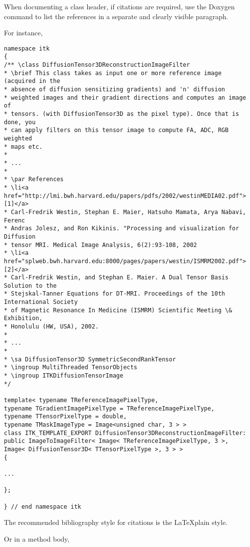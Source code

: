 When documenting a class header, if citations are required, use the Doxygen
 command to list the references in a separate and clearly
visible paragraph.

For instance,

\small
\begin{verbatim}
namespace itk
{
/** \class DiffusionTensor3DReconstructionImageFilter
* \brief This class takes as input one or more reference image (acquired in the
* absence of diffusion sensitizing gradients) and 'n' diffusion
* weighted images and their gradient directions and computes an image of
* tensors. (with DiffusionTensor3D as the pixel type). Once that is done, you
* can apply filters on this tensor image to compute FA, ADC, RGB weighted
* maps etc.
*
* ...
*
* \par References
* \li<a href="http://lmi.bwh.harvard.edu/papers/pdfs/2002/westinMEDIA02.pdf">[1]</a>
* Carl-Fredrik Westin, Stephan E. Maier, Hatsuho Mamata, Arya Nabavi, Ferenc
* Andras Jolesz, and Ron Kikinis. "Processing and visualization for Diffusion
* tensor MRI. Medical Image Analysis, 6(2):93-108, 2002
* \li<a href="splweb.bwh.harvard.edu:8000/pages/papers/westin/ISMRM2002.pdf">[2]</a>
* Carl-Fredrik Westin, and Stephan E. Maier. A Dual Tensor Basis Solution to the
* Stejskal-Tanner Equations for DT-MRI. Proceedings of the 10th International Society
* of Magnetic Resonance In Medicine (ISMRM) Scientific Meeting \& Exhibition,
* Honolulu (HW, USA), 2002.
*
* ...
*
* \sa DiffusionTensor3D SymmetricSecondRankTensor
* \ingroup MultiThreaded TensorObjects
* \ingroup ITKDiffusionTensorImage
*/

template< typename TReferenceImagePixelType,
typename TGradientImagePixelType = TReferenceImagePixelType,
typename TTensorPixelType = double,
typename TMaskImageType = Image<unsigned char, 3 > >
class ITK_TEMPLATE_EXPORT DiffusionTensor3DReconstructionImageFilter:
public ImageToImageFilter< Image< TReferenceImagePixelType, 3 >,
Image< DiffusionTensor3D< TTensorPixelType >, 3 > >
{

...

};

} // end namespace itk
\end{verbatim}
\normalsize

The recommended bibliography style for citations is the \LaTeX plain style.

Or in a method body,

